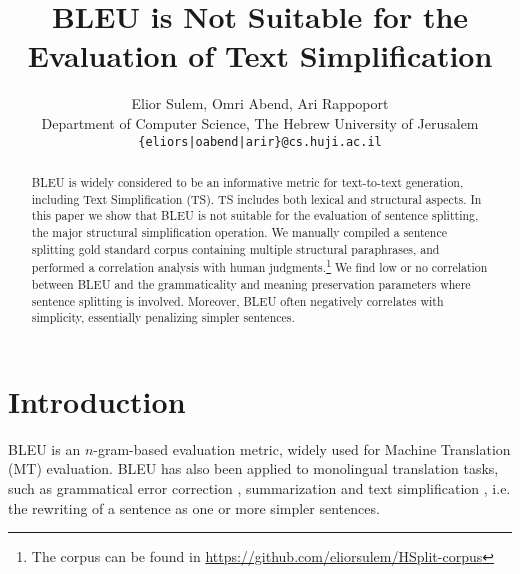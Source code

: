 \documentclass[11pt,a4paper]{article}
\title{BLEU is Not Suitable for the Evaluation of Text Simplification}
\author{Elior Sulem, Omri Abend, Ari Rappoport \\
 Department of Computer Science, The Hebrew University of Jerusalem\\
{\tt \{eliors|oabend|arir\}@cs.huji.ac.il}
 }
\date{}
\begin{document}
\maketitle
\begin{abstract}
  
  BLEU is widely considered to be an informative
  metric for text-to-text generation, including Text Simplification (TS).
  TS includes both lexical and structural aspects.
  In this paper we show that BLEU is not suitable for the evaluation of sentence splitting, the major
  structural simplification operation. We manually compiled a sentence splitting gold standard corpus
  containing multiple structural paraphrases, and performed a correlation analysis with human judgments.\footnote{The corpus can be found in \url{https://github.com/eliorsulem/HSplit-corpus}}
  We find low or no correlation between BLEU and the grammaticality and meaning preservation parameters
  where sentence splitting is involved. Moreover, BLEU often negatively correlates with
  simplicity, essentially penalizing simpler sentences.
\end{abstract}

\section{Introduction} \label{sec:introduction}

BLEU \citep{P02} is an $n$-gram-based evaluation metric, widely used for Machine Translation (MT) evaluation. BLEU has also been 
applied to monolingual translation tasks, such as grammatical error correction \citep{PL11}, summarization \citep{G15} and text simplification \citep{NG14,Sa15,Xu16}, i.e.
the rewriting of a sentence as one or more simpler sentences.

\end{document}
